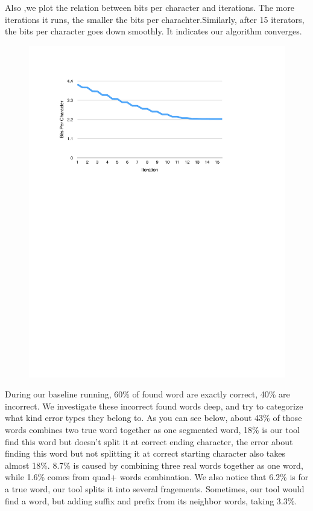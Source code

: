 \documentclass[11pt, oneside, fleqn]{article}
\begin{document}
  Also ,we plot the relation between bits per character and iterations. The more iterations it runs, the smaller the bits per charachter.Similarly, after 15 iterators, the bits per character goes down smoothly. It indicates our algorithm converges. 
  \begin{figure}[h]
  \includegraphics{./figure/bit_of_char_per_iteration.pdf}
  \end{figure}

  During our baseline running, 60\% of found word are exactly correct, 40\% are incorrect. We investigate these incorrect found words deep, and try to categorize what kind error types they belong to. As you can see below, about 43\% of those words combines two true word together as one segmented word, 18\% is our tool find this word but doesn't split it at correct ending character, the error about finding this word but not splitting it at correct starting character also takes almost 18\%. 8.7\% is caused by combining three real words together as one word, while 1.6\% comes from quad+ words combination. We also notice that 6.2\% is for a true word, our tool splits it into several fragements. Sometimes, our tool would find a word, but adding suffix and prefix from its neighbor words, taking 3.3\%.
\end{document}
